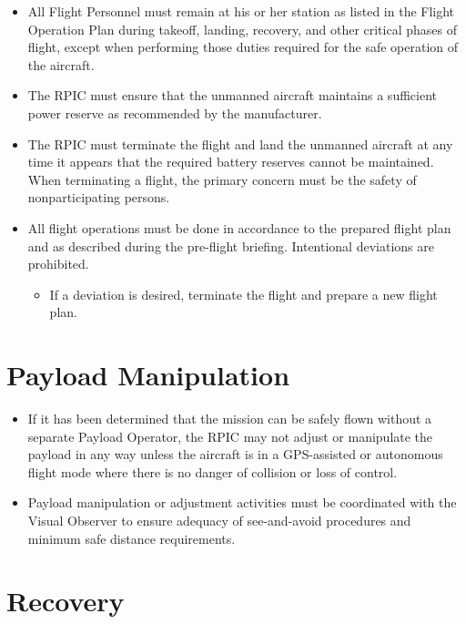 \documentclass[
]{book}
\providecommand{\tightlist}{%
  \setlength{\itemsep}{0pt}\setlength{\parskip}{0pt}}
\begin{document}
\begin{itemize}
\item
  All Flight Personnel must remain at his or her station as listed in the Flight Operation Plan during takeoff, landing, recovery, and other critical phases of flight, except when performing those duties required for the safe operation of the aircraft.
\item
  The RPIC must ensure that the unmanned aircraft maintains a sufficient power reserve as recommended by the manufacturer.
\item
  The RPIC must terminate the flight and land the unmanned aircraft at any time it appears that the required battery reserves cannot be maintained. When terminating a flight, the primary concern must be the safety of nonparticipating persons.
\item
  All flight operations must be done in accordance to the prepared flight plan and as described during the pre-flight briefing. Intentional deviations are prohibited.

  \begin{itemize}
  \tightlist
  \item
    If a deviation is desired, terminate the flight and prepare a new flight plan.
  \end{itemize}
\end{itemize}

\hypertarget{payload-manipulation}{%
\section{Payload Manipulation}\label{payload-manipulation}}

\begin{itemize}
\tightlist
\item
  If it has been determined that the mission can be safely flown without a separate Payload Operator, the RPIC may not adjust or manipulate the payload in any way unless the aircraft is in a GPS-assisted or autonomous flight mode where there is no danger of collision or loss of control.
\item
  Payload manipulation or adjustment activities must be coordinated with the Visual Observer to ensure adequacy of see-and-avoid procedures and minimum safe distance requirements.
\end{itemize}

\hypertarget{recovery}{%
\section{Recovery}\label{recovery}}
\end{document}
